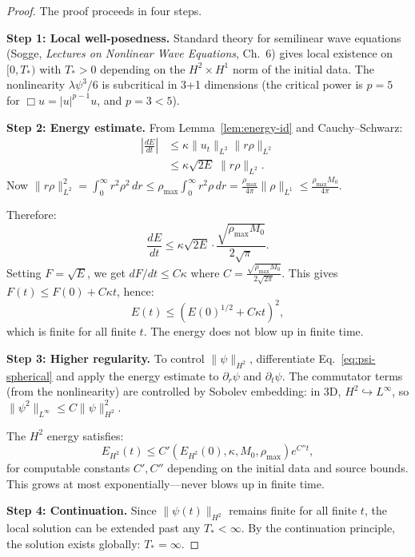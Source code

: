 \documentclass[11pt,a4paper]{article}
\theoremstyle{remark}
\begin{document}
\begin{proof}
The proof proceeds in four steps.

\textbf{Step 1: Local well-posedness.}
Standard theory for semilinear wave equations (Sogge, \emph{Lectures on
Nonlinear Wave Equations}, Ch.~6) gives local existence on $[0, T_*)$ with
$T_* > 0$ depending on the $H^2 \times H^1$ norm of the initial data.
The nonlinearity $\lambda\psi^3/6$ is subcritical in 3+1 dimensions
(the critical power is $p = 5$ for $\Box u = |u|^{p-1}u$, and $p = 3 < 5$).

\textbf{Step 2: Energy estimate.}
From Lemma~\ref{lem:energy-id} and Cauchy--Schwarz:
\begin{align}
\left|\frac{dE}{dt}\right| &\leq \kappa\|u_t\|_{L^2}\|r\rho\|_{L^2} \\
&\leq \kappa\sqrt{2E}\;\|r\rho\|_{L^2}.
\end{align}
Now $\|r\rho\|_{L^2}^2 = \int_0^\infty r^2\rho^2\,dr \leq \rho_{\max}\int_0^\infty r^2\rho\,dr
= \frac{\rho_{\max}}{4\pi}\|\rho\|_{L^1} \leq \frac{\rho_{\max}M_0}{4\pi}$.

Therefore:
\begin{equation}
\frac{dE}{dt} \leq \kappa\sqrt{2E}\cdot\frac{\sqrt{\rho_{\max}M_0}}{2\sqrt{\pi}}.
\end{equation}
Setting $F = \sqrt{E}$, we get $dF/dt \leq C\kappa$ where $C = \frac{\sqrt{\rho_{\max}M_0}}{2\sqrt{2\pi}}$.
This gives $F(t) \leq F(0) + C\kappa t$, hence:
\begin{equation}
E(t) \leq (E(0)^{1/2} + C\kappa t)^2,
\label{eq:energy-bound}
\end{equation}
which is finite for all finite $t$. The energy does not blow up in finite time.

\textbf{Step 3: Higher regularity.}
To control $\|\psi\|_{H^2}$, differentiate Eq.~\eqref{eq:psi-spherical} and
apply the energy estimate to $\partial_r\psi$ and $\partial_t\psi$.
The commutator terms (from the nonlinearity) are controlled by Sobolev embedding:
in 3D, $H^2 \hookrightarrow L^\infty$, so $\|\psi^2\|_{L^\infty} \leq C\|\psi\|_{H^2}^2$.

The $H^2$ energy satisfies:
\begin{equation}
E_{H^2}(t) \leq C'\left(E_{H^2}(0), \kappa, M_0, \rho_{\max}\right) e^{C''t},
\end{equation}
for computable constants $C', C''$ depending on the initial data and source bounds.
This grows at most exponentially---never blows up in finite time.

\textbf{Step 4: Continuation.}
Since $\|\psi(t)\|_{H^2}$ remains finite for all finite $t$, the local
solution can be extended past any $T_* < \infty$. By the continuation
principle, the solution exists globally: $T_* = \infty$.
\end{proof}
\end{document}
